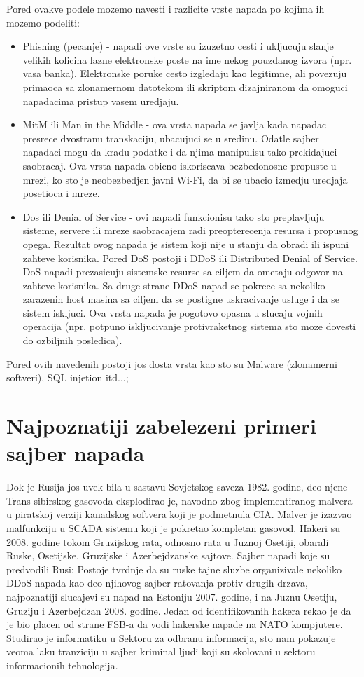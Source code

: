 \documentclass[a4paper]{article}
\begin{document}
{Pored ovakve podele mozemo navesti i razlicite vrste napada po kojima ih mozemo podeliti:
\begin{itemize}
    \item Phishing (pecanje) - napadi ove vrste su izuzetno cesti i ukljucuju slanje velikih kolicina lazne elektronske poste na ime nekog pouzdanog izvora (npr. vasa banka). Elektronske poruke cesto izgledaju kao legitimne, ali povezuju primaoca sa zlonamernom datotekom ili skriptom dizajniranom da omoguci napadacima pristup vasem uredjaju.
    \item MitM ili Man in the Middle - ova vrsta napada se javlja kada napadac presrece dvostranu transkaciju, ubacujuci se u sredinu. Odatle sajber napadaci mogu da kradu podatke i da njima manipulisu tako prekidajuci saobracaj. Ova vrsta napada obicno iskoriscava bezbedonosne propuste u mrezi, ko sto je neobezbedjen javni Wi-Fi, da bi se ubacio izmedju uredjaja posetioca i mreze.
    \item Dos ili Denial of Service - ovi napadi funkcionisu tako sto preplavljuju sisteme, servere ili mreze saobracajem radi preopterecenja resursa i propusnog opega. Rezultat ovog napada je sistem koji nije u stanju da obradi ili ispuni zahteve korisnika.
    Pored DoS postoji i DDoS  ili Distributed Denial of Service. DoS napadi prezasicuju sistemske resurse sa ciljem da ometaju odgovor na zahteve korisnika. Sa druge strane DDoS napad se pokrece sa nekoliko zarazenih host masina sa ciljem da se postigne uskracivanje usluge i da se sistem iskljuci. Ova vrsta napada je pogotovo opasna u slucaju vojnih operacija (npr. potpuno iskljucivanje protivraketnog sistema sto moze dovesti do ozbiljnih posledica).
\end{itemize}    
Pored ovih navedenih postoji jos dosta vrsta kao sto su Malware (zlonamerni softveri), SQL injetion itd...;




\section{Najpoznatiji zabelezeni primeri sajber napada}
\label{sec:naslovM}


Dok je Rusija jos uvek bila u sastavu Sovjetskog saveza 1982. godine, deo njene Trans-sibirskog gasovoda eksplodirao je, navodno zbog implementiranog malvera u piratskoj verziji kanadskog softvera koji je podmetnula CIA. Malver je izazvao malfunkciju u SCADA sistemu koji je pokretao kompletan gasovod.
Hakeri su 2008. godine tokom Gruzijskog rata, odnosno rata u Juznoj Osetiji, obarali Ruske, Osetijske, Gruzijske i Azerbejdzanske sajtove.
Sajber napadi koje su predvodili Rusi:
Postoje tvrdnje da su ruske tajne sluzbe organizivale nekoliko DDoS napada kao deo njihovog sajber ratovanja protiv drugih drzava, najpoznatiji slucajevi su napad na Estoniju 2007. godine, i na Juznu Osetiju, Gruziju i Azerbejdzan 2008. godine. Jedan od identifikovanih hakera rekao je da je bio placen od strane FSB-a da vodi hakerske napade na NATO kompjutere. Studirao je informatiku u Sektoru za odbranu informacija, sto nam pokazuje veoma laku tranziciju u sajber kriminal ljudi koji su skolovani u sektoru informacionih tehnologija.

}
\end{document}
